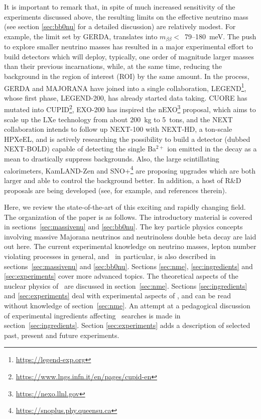 It is important to remark that, in spite of much increased sensitivity of the experiments discussed above, the resulting limits on the effective neutrino mass (see section \ref{sec:bb0nu} for a detailed discussion) are relatively modest. For example, the limit set by GERDA, translates into $m_{\beta\beta} <$~79--180~meV. The push to explore smaller neutrino masses has resulted in a major experimental effort to build detectors which will deploy, typically, one order of magnitude larger masses than their previous incarnations, while, at the same time, reducing the background in the region of interest (ROI) by the same amount. In the process, GERDA and MAJORANA have joined into a single collaboration, LEGEND\footnote{\url{https://legend-exp.org}}, whose first phase, LEGEND-200, has already started data taking. CUORE has mutated into CUPID\footnote{\url{https://www.lngs.infn.it/en/pages/cupid-en}}, EXO-200 has inspired the nEXO\footnote{\url{https://nexo.llnl.gov}} proposal, which aims to scale up the LXe technology from about 200~kg to 5~tons, and the NEXT collaboration intends to follow up NEXT-100 with NEXT-HD, a ton-scale HPXeEL, and is actively researching the possibility to build a detector (dubbed NEXT-BOLD) capable of detecting the single Ba$^{2+}$ ion emitted in the decay as a mean to drastically suppress backgrounds. Also, the large scintillating calorimeters, KamLAND-Zen and SNO+\footnote{\url{https://snoplus.phy.queensu.ca}} are proposing upgrades which are both larger and able to control the background better. In addition, a host of R\&D proposals are being developed (see, for example, \cite{Dell_Oro_2016} and references therein).

Here, we review the state-of-the-art of this exciting and rapidly changing field. 
The organization of the paper is as follows. The introductory material is covered in sections~\ref{sec:massivenu} and \ref{sec:bb0nu}. The key particle physics concepts involving massive Majorana neutrinos and neutrinoless double beta decay are laid out here. The current experimental knowledge on neutrino masses, lepton number violating processes in general, and \bbonu\ in particular, is also described in sections~\ref{sec:massivenu} and \ref{sec:bb0nu}. Sections \ref{sec:nme}, \ref{sec:ingredients} and \ref{sec:experiments} cover more advanced topics. The theoretical aspects of the nuclear physics of \bbonu\ are discussed in section~\ref{sec:nme}. Sections \ref{sec:ingredients} and \ref{sec:experiments} deal with experimental aspects of \bbonu, and can be read without knowledge of section~\ref{sec:nme}. An attempt at a pedagogical discussion of experimental ingredients affecting \bbonu\ searches is made in section~\ref{sec:ingredients}. Section \ref{sec:experiments} adds a description of selected past, present and future experiments. 

